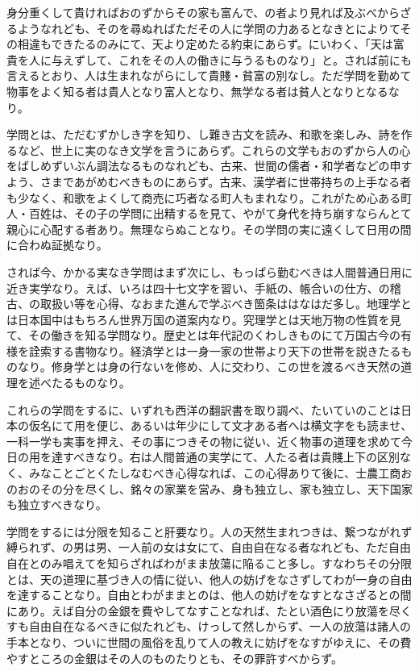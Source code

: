身分重くして貴ければおのずからその家も富んで、の者より見れば及ぶべからざるようなれども、そのを尋ぬればただその人に学問の力あるとなきとによりてその相違もできたるのみにて、天より定めたる約束にあらず。にいわく、「天は富貴を人に与えずして、これをその人の働きに与うるものなり」と。されば前にも言えるとおり、人は生まれながらにして貴賤・貧富の別なし。ただ学問を勤めて物事をよく知る者は貴人となり富人となり、無学なる者は貧人となりとなるなり。

学問とは、ただむずかしき字を知り、し難き古文を読み、和歌を楽しみ、詩を作るなど、世上に実のなき文学を言うにあらず。これらの文学もおのずから人の心をばしめずいぶん調法なるものなれども、古来、世間の儒者・和学者などの申すよう、さまであがめむべきものにあらず。古来、漢学者に世帯持ちの上手なる者も少なく、和歌をよくして商売に巧者なる町人もまれなり。これがため心ある町人・百姓は、その子の学問に出精するを見て、やがて身代を持ち崩すならんとて親心に心配する者あり。無理ならぬことなり。その学問の実に遠くして日用の間に合わぬ証拠なり。

されば今、かかる実なき学問はまず次にし、もっぱら勤むべきは人間普通日用に近き実学なり。えば、いろは四十七文字を習い、手紙の、帳合いの仕方、の稽古、の取扱い等を心得、なおまた進んで学ぶべき箇条ははなはだ多し。地理学とは日本国中はもちろん世界万国の道案内なり。究理学とは天地万物の性質を見て、その働きを知る学問なり。歴史とは年代記のくわしきものにて万国古今の有様を詮索する書物なり。経済学とは一身一家の世帯より天下の世帯を説きたるものなり。修身学とは身の行ないを修め、人に交わり、この世を渡るべき天然の道理を述べたるものなり。

これらの学問をするに、いずれも西洋の翻訳書を取り調べ、たいていのことは日本の仮名にて用を便じ、あるいは年少にして文才ある者へは横文字をも読ませ、一科一学も実事を押え、その事につきその物に従い、近く物事の道理を求めて今日の用を達すべきなり。右は人間普通の実学にて、人たる者は貴賤上下の区別なく、みなことごとくたしなむべき心得なれば、この心得ありて後に、士農工商おのおのその分を尽くし、銘々の家業を営み、身も独立し、家も独立し、天下国家も独立すべきなり。

学問をするには分限を知ること肝要なり。人の天然生まれつきは、繋つながれず縛られず、の男は男、一人前の女は女にて、自由自在なる者なれども、ただ自由自在とのみ唱えてを知らざればわがまま放蕩に陥ること多し。すなわちその分限とは、天の道理に基づき人の情に従い、他人の妨げをなさずしてわが一身の自由を達することなり。自由とわがままとのは、他人の妨げをなすとなさざるとの間にあり。えば自分の金銀を費やしてなすことなれば、たとい酒色にり放蕩を尽くすも自由自在なるべきに似たれども、けっして然しからず、一人の放蕩は諸人の手本となり、ついに世間の風俗を乱りて人の教えに妨げをなすがゆえに、その費やすところの金銀はその人のものたりとも、その罪許すべからず。

